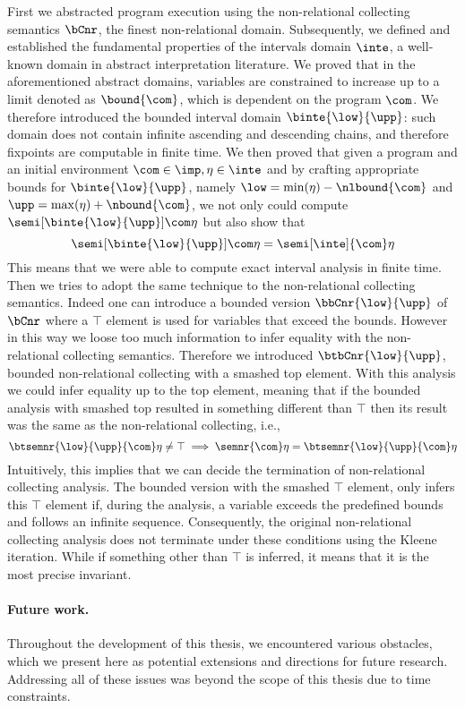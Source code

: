 First we abstracted program execution using the non-relational
collecting semantics \(\bCnr\), the finest non-relational
domain. Subsequently, we defined and established the fundamental
properties of the intervals domain \(\inte\), a well-known domain in
abstract interpretation literature. We proved that in the
aforementioned abstract domains, variables are constrained to increase
up to a limit denoted as \(\bound{\com}\), which is dependent on the
program \(\com\). We therefore introduced the bounded interval domain
\(\binte{\low}{\upp}\): such domain does not contain infinite
ascending and descending chains, and therefore fixpoints are
computable in finite time. We then proved that given a program and an
initial environment \(\com\in\imp, \eta\in\inte\) and by crafting
appropriate bounds for \(\binte{\low}{\upp}\), namely
\(\low = \min(\eta) - \nlbound{\com}\) and
\(\upp = \max(\eta) + \nbound{\com}\), we not only could compute
\(\semi[\binte{\low}{\upp}]{\com}\eta\) but also show
that \[\semi[\binte{\low}{\upp}]{\com}\eta = \semi[\inte]{\com}\eta\]
This means that we were able to compute exact interval analysis in
finite time. Then we tries to adopt the same technique to the
non-relational collecting semantics. Indeed one can introduce a
bounded version \(\bbCnr{\low}{\upp}\) of \(\bCnr\) where a \(\top\)
element is used for variables that exceed the bounds. However in this
way we loose too much information to infer equality with the
non-relational collecting semantics.  Therefore we introduced
\(\btbCnr{\low}{\upp}\), bounded non-relational collecting with a
smashed top element. With this analysis we could infer equality up to
the top element, meaning that if the bounded analysis with smashed top
resulted in something different than \(\top\) then its result was the
same as the non-relational collecting, i.e.,
\[\btsemnr{\low}{\upp}{\com}\eta \neq \top \implies \semnr{\com}\eta =
  \btsemnr{\low}{\upp}{\com}\eta\] Intuitively, this implies that we
can decide the termination of non-relational collecting analysis. The
bounded version with the smashed \(\top\) element, only infers this
\(\top\) element if, during the analysis, a variable exceeds the
predefined bounds and follows an infinite sequence. Consequently, the
original non-relational collecting analysis does not terminate under
these conditions using the Kleene iteration. While if something other
than \(\top\) is inferred, it means that it is the most precise
invariant.

\paragraph*{Future work.}
Throughout the development of this thesis, we encountered various
obstacles, which we present here as potential extensions and
directions for future research. Addressing all of these issues was
beyond the scope of this thesis due to time constraints.

